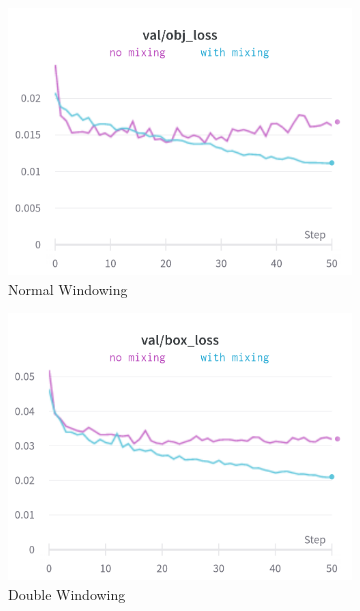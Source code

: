 \begin{figure}[!h]
\centering
\begin{subfigure}{0.33\textwidth}
  \centering
  \includegraphics[width=\linewidth]{images/implementation/windowing/mixing/mixing_obj_loss}
  \caption{Normal Windowing}
\end{subfigure}%
\begin{subfigure}{0.33\textwidth}
  \centering
  \includegraphics[width=\linewidth]{images/implementation/windowing/mixing/mixing_box_loss}
  \caption{Double Windowing}
\end{subfigure}%
\begin{subfigure}{0.33\textwidth}

\end{subfigure}
\end{figure}
